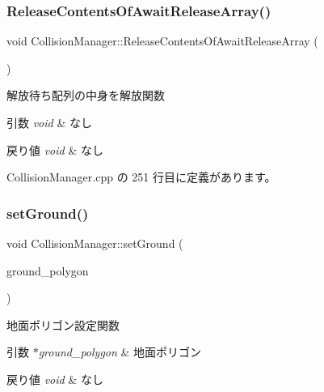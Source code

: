 \subsubsection{\texorpdfstring{Release\+Contents\+Of\+Await\+Release\+Array()}{ReleaseContentsOfAwaitReleaseArray()}}
{\footnotesize\ttfamily void Collision\+Manager\+::\+Release\+Contents\+Of\+Await\+Release\+Array (\begin{DoxyParamCaption}{ }\end{DoxyParamCaption})\hspace{0.3cm}{\ttfamily [private]}}



解放待ち配列の中身を解放関数 


\begin{DoxyParams}{引数}
{\em void} & なし \\
\hline
\end{DoxyParams}

\begin{DoxyRetVals}{戻り値}
{\em void} & なし \\
\hline
\end{DoxyRetVals}


 Collision\+Manager.\+cpp の 251 行目に定義があります。

\mbox{\label{class_collision_manager_a0591bf9f6fc5bfbd9041106c5297ef83}} 
\subsubsection{\texorpdfstring{set\+Ground()}{setGround()}}
{\footnotesize\ttfamily void Collision\+Manager\+::set\+Ground (\begin{DoxyParamCaption}\item[{\mbox{\hyperlink{class_mesh_plane_polygon}{Mesh\+Plane\+Polygon}} $\ast$}]{ground\+\_\+polygon }\end{DoxyParamCaption})}



地面ポリゴン設定関数 


\begin{DoxyParams}{引数}
{\em $\ast$ground\+\_\+polygon} & 地面ポリゴン \\
\hline
\end{DoxyParams}

\begin{DoxyRetVals}{戻り値}
{\em void} & なし \\
\hline
\end{DoxyRetVals}


